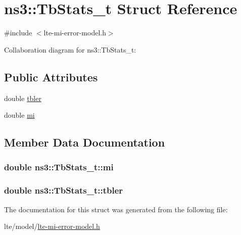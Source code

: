 \hypertarget{structns3_1_1TbStats__t}{}\section{ns3\+:\+:Tb\+Stats\+\_\+t Struct Reference}
\label{structns3_1_1TbStats__t}


{\ttfamily \#include $<$lte-\/mi-\/error-\/model.\+h$>$}



Collaboration diagram for ns3\+:\+:Tb\+Stats\+\_\+t\+:
\subsection*{Public Attributes}
\begin{DoxyCompactItemize}
\item 
double \hyperlink{structns3_1_1TbStats__t_a8928d51b5937222434495be9f24808ce}{tbler}
\item 
double \hyperlink{structns3_1_1TbStats__t_a574f4e3effde1c90596e9607a3ec8b13}{mi}
\end{DoxyCompactItemize}


\subsection{Member Data Documentation}
\subsubsection[{\texorpdfstring{mi}{mi}}]{\setlength{\rightskip}{0pt plus 5cm}double ns3\+::\+Tb\+Stats\+\_\+t\+::mi}\hypertarget{structns3_1_1TbStats__t_a574f4e3effde1c90596e9607a3ec8b13}{}\label{structns3_1_1TbStats__t_a574f4e3effde1c90596e9607a3ec8b13}
\subsubsection[{\texorpdfstring{tbler}{tbler}}]{\setlength{\rightskip}{0pt plus 5cm}double ns3\+::\+Tb\+Stats\+\_\+t\+::tbler}\hypertarget{structns3_1_1TbStats__t_a8928d51b5937222434495be9f24808ce}{}\label{structns3_1_1TbStats__t_a8928d51b5937222434495be9f24808ce}


The documentation for this struct was generated from the following file\+:\begin{DoxyCompactItemize}
\item 
lte/model/\hyperlink{lte-mi-error-model_8h}{lte-\/mi-\/error-\/model.\+h}\end{DoxyCompactItemize}
